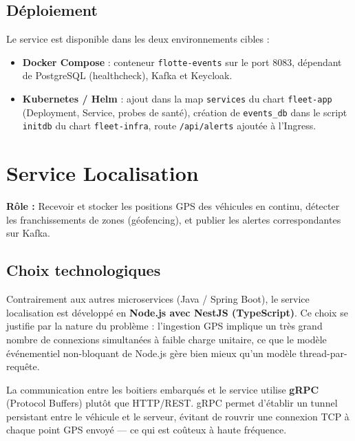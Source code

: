 \documentclass[12pt,a4paper]{article}
\begin{document}
\subsection{D\'{e}ploiement}

Le service est disponible dans les deux environnements cibles :

\begin{itemize}[leftmargin=*]
  \item \textbf{Docker Compose} : conteneur \texttt{flotte-events} sur le port 8083, d\'{e}pendant de PostgreSQL (healthcheck), Kafka et Keycloak.
  \item \textbf{Kubernetes / Helm} : ajout dans la map \texttt{services} du chart \texttt{fleet-app} (Deployment, Service, probes de sant\'{e}), cr\'{e}ation de \texttt{events\_db} dans le script \texttt{initdb} du chart \texttt{fleet-infra}, route \texttt{/api/alerts} ajout\'{e}e \`{a} l'Ingress.
\end{itemize}

\newpage
\section{Service Localisation}

\begin{infobox}
\textbf{R\^{o}le :} Recevoir et stocker les positions GPS des v\'{e}hicules en continu, d\'{e}tecter les franchissements de zones (g\'{e}ofencing), et publier les alertes correspondantes sur Kafka.
\end{infobox}

\subsection{Choix technologiques}

Contrairement aux autres microservices (Java / Spring Boot), le service localisation est d\'{e}velopp\'{e} en \textbf{Node.js avec NestJS (TypeScript)}. Ce choix se justifie par la nature du probl\`{e}me : l'ingestion GPS implique un tr\`{e}s grand nombre de connexions simultan\'{e}es \`{a} faible charge unitaire, ce que le mod\`{e}le \'{e}v\'{e}nementiel non-bloquant de Node.js g\`{e}re bien mieux qu'un mod\`{e}le thread-par-requ\^{e}te.

La communication entre les boitiers embarqu\'{e}s et le service utilise \textbf{gRPC} (Protocol Buffers) plut\^{o}t que HTTP/REST. gRPC permet d'\'{e}tablir un tunnel persistant entre le v\'{e}hicule et le serveur, \'{e}vitant de rouvrir une connexion TCP \`{a} chaque point GPS envoy\'{e} --- ce qui est co\^{u}teux \`{a} haute fr\'{e}quence.
\end{document}
